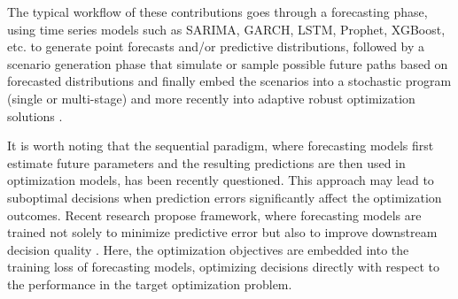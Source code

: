 \documentclass[ijoc,sglanonrev]{informs4}
\begin{document}
The typical workflow of these contributions goes through a forecasting phase, using time series models such as SARIMA, GARCH, LSTM, Prophet, XGBoost, etc. to generate point forecasts and/or predictive distributions, followed by a scenario generation phase that simulate or sample possible future paths based on forecasted distributions and finally embed the scenarios into a stochastic program (single or multi-stage) \cite{R18,FTW18,BK19} and more recently into adaptive robust optimization solutions \cite{BB23}.

It is worth noting that the sequential paradigm, where forecasting models first estimate future parameters and the resulting  predictions are then used in optimization models, has been recently questioned. This approach may lead to suboptimal decisions when prediction errors significantly affect the optimization outcomes.
Recent research propose framework, where forecasting models are trained not solely to minimize predictive error but also to improve downstream decision quality \cite{DAK17,WDT19}. Here, the optimization objectives are embedded into the training loss of forecasting models, optimizing decisions directly with respect to the performance in the target optimization problem.

\end{document}
